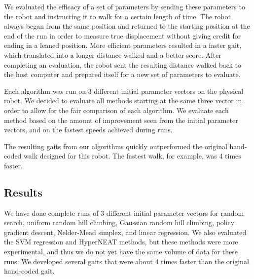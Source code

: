 We evaluated the efficacy of a set of parameters by sending these
parameters to the robot and instructing it to walk for a certain
length of time. The robot always began from the same position and
returned to the starting position at the end of the run in order to
measure true displacement without giving credit for ending in a leaned
position. More efficient parameters resulted in a faster gait, which
translated into a longer distance walked and a better score. After completing
an evaluation, the robot sent the resulting distance walked back to the
host computer and prepared itself for a new set of parameters to evaluate.

Each algorithm was run on 3 different initial parameter vectors on the
physical robot. We decided to evaluate all methods starting at the
same three vector in order to allow for the fair comparison of each
algorithm.  We evaluate each method based on the amount of improvement
seen from the initial parameter vectors, and on the fastest speeds
achieved during runs.

The resulting gaits from our algorithms quickly outperformed the original
hand-coded walk designed for this robot. The fastest walk, for example, was
4 times faster.

\subsection{Results}

We have done complete runs of 3 different initial parameter vectors
for random search, uniform random hill climbing, Gaussian random hill
climbing, policy gradient descent, Nelder-Mead simplex, and linear
regression.  We also evaluated the SVM regression and HyperNEAT
methods, but these methods were more experimental, and thus we do not
yet have the same volume of data for these runs.  We developed several
gaits that were about 4 times faster than the original hand-coded
gait.




